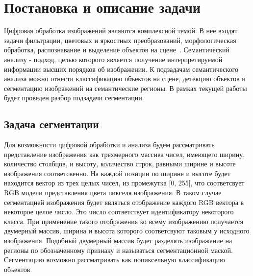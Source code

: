 \section{Постановка и описание задачи}
\label{task_description_start}

Цифровая обработка изображений являются комплексной темой. В нее входят задачи фильтрации, цветовых и яркостных преобразований, морфологическая обработка, распознавание и выделение объектов на сцене~\autocite{gonzalez2008digital}. Семантический анализу - подход, целью которого является получение интерпретируемой информации высших порядков об изображении. К подзадачам семантического анализа можно отнести классификацию объектов на сцене, детекцию объектов и сегментацию изображений на семантические регионы. В рамках текущей работы будет проведен разбор подзадачи сегментации.

\subsection{Задача сегментации}

Для возможности цифровой обработки и анализа будем рассматривать представление изображения как трехмерного массива чисел, имеющего ширину, количество столбцов, и высоту, количество строк, равными ширине и высоте изображения соответсвенно. На каждой позиции по ширине и высоте будет находится вектор из трех целых чисел, из промежутка [0, 255], что соответсвует RGB модели представления цвета пикселя изображения. В таком случае сегментацией изображения будет являться отображение каждого RGB вектора в некоторое целое число. Это число соответствует идентификатору некоторого класса. При применение такого отображения ко всему изображению получается двумерный массив, ширина и высота которого соответсвуют таковым у исходного изображения. Подобный двумерный массив будет разделять изображение на регионы по обозначенному признаку и называться сегментационной маской. Сегментацию возможно рассматривать как попиксельную классификацию объектов.

